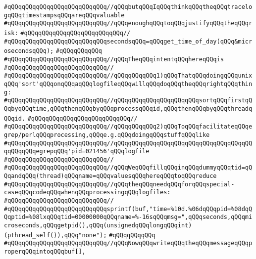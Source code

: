 \verb|#qQQqqQQqqQQqqQQqqQQqqQQqqQQq//qQQqbutqQQqIqQQqthinkqQQqtheqQQqtracelogqQQqtimestampsqQQqareqQQqvaluable|\newline
\verb|#qQQqqQQqqQQqqQQqqQQqqQQqqQQq//qQQqenoughqQQqtoqQQqjustifyqQQqtheqQQqrisk:|\newline
\verb|#qQQqqQQqqQQqqQQqqQQqqQQqqQQq//|\newline
\verb|#qQQqqQQqqQQqqQQqqQQqqQQqqQQqsecondsqQQq=qQQqget_time_of_day(qQQq&microsecondsqQQq);|\newline
\verb|#qQQqqQQqqQQq|\newline
\verb|#qQQqqQQqqQQqqQQqqQQqqQQqqQQq//qQQqTheqQQqintentqQQqhereqQQqis|\newline
\verb|#qQQqqQQqqQQqqQQqqQQqqQQqqQQq//|\newline
\verb|#qQQqqQQqqQQqqQQqqQQqqQQqqQQq//qQQqqQQqqQQq1)qQQqThatqQQqdoingqQQqunixqQQq'sort'qQQqonqQQqaqQQqlogfileqQQqwillqQQqdoqQQqtheqQQqrightqQQqthing:|\newline
\verb|#qQQqqQQqqQQqqQQqqQQqqQQqqQQq//qQQqqQQqqQQqqQQqqQQqqQQqsortqQQqfirstqQQqbyqQQqtime,qQQqthenqQQqbyqQQqprocessqQQqid,qQQqthenqQQqbyqQQqthreadqQQqid.|\newline
\verb|#qQQqqQQqqQQqqQQqqQQqqQQqqQQq//|\newline
\verb|#qQQqqQQqqQQqqQQqqQQqqQQqqQQq//qQQqqQQqqQQq2)qQQqToqQQqfacilitateqQQqegrep/perlqQQqprocessing,qQQqe.g.qQQqdoingqQQqstuffqQQqlike|\newline
\verb|#qQQqqQQqqQQqqQQqqQQqqQQqqQQq//qQQqqQQqqQQqqQQqqQQqqQQqqQQqqQQqqQQqqQQqqQQqqQQqegrepqQQq'pid=021456'qQQqlogfile|\newline
\verb|#qQQqqQQqqQQqqQQqqQQqqQQqqQQq//|\newline
\verb|#qQQqqQQqqQQqqQQqqQQqqQQqqQQq//qQQqWeqQQqfillqQQqinqQQqdummyqQQqtid=qQQqandqQQq(thread)qQQqname=qQQqvaluesqQQqhereqQQqtoqQQqreduce|\newline
\verb|#qQQqqQQqqQQqqQQqqQQqqQQqqQQq//qQQqtheqQQqneedqQQqforqQQqspecial-caseqQQqcodeqQQqwhenqQQqprocessingqQQqlogfiles:|\newline
\verb|#qQQqqQQqqQQqqQQqqQQqqQQqqQQq//|\newline
\verb|#qQQqqQQqqQQqqQQqqQQqqQQqqQQqsprintf(buf,"time=%10d.%06dqQQqpid=%08dqQQqptid=%08lxqQQqtid=00000000qQQqname=%-16sqQQqmsg=",qQQqseconds,qQQqmicroseconds,qQQqgetpid(),qQQq(unsignedqQQqlongqQQqint)(pthread_self()),qQQq"none");|\newline
\verb|#qQQqqQQqqQQq|\newline
\verb|#qQQqqQQqqQQqqQQqqQQqqQQqqQQq//qQQqNowqQQqwriteqQQqtheqQQqmessageqQQqproperqQQqintoqQQqbuf[],|\newline
